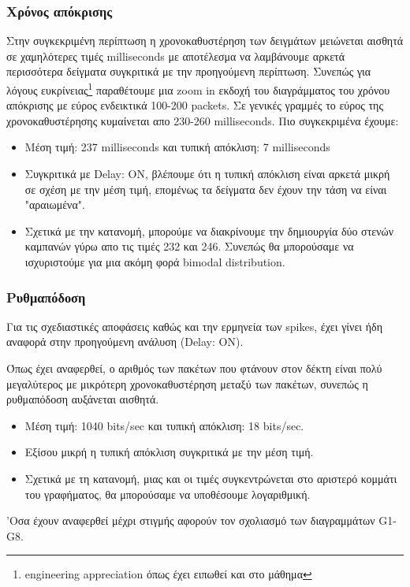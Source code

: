 \documentclass[hidelinks, 12pt, a4paper]{article}
\begin{document}
\subsubsection{Χρόνος απόκρισης}
Στην συγκεκριμένη περίπτωση η χρονοκαθυστέρηση των δειγμάτων μειώνεται αισθητά σε χαμηλότερες τιμές milliseconds με αποτέλεσμα να λαμβάνουμε αρκετά περισσότερα δείγματα συγκριτικά με την προηγούμενη περίπτωση. Συνεπώς για λόγους ευκρίνειας\footnote{engineering appreciation όπως έχει ειπωθεί και στο μάθημα} παραθέτουμε μια zoom in εκδοχή του διαγράμματος του χρόνου απόκρισης με εύρος ενδεικτικά 100-200 packets. Σε γενικές γραμμές το εύρος της χρονοκαθυστέρησης κυμαίνεται απο 230-260 milliseconds. Πιο συγκεκριμένα έχουμε:
\begin{itemize}
    \item Μέση τιμή: 237 milliseconds και τυπική απόκλιση: 7 milliseconds 
    \item Συγκριτικά με Delay: ON, βλέπουμε ότι η τυπική απόκλιση είναι αρκετά μικρή σε σχέση με την μέση τιμή, επομένως τα δείγματα δεν έχουν την τάση να είναι "αραιωμένα".
    \item Σχετικά με την κατανομή, μπορούμε να διακρίνουμε την δημιουργία δύο στενών καμπανών γύρω απο τις τιμές 232 και 246. Συνεπώς θα μπορούσαμε να ισχυριστούμε για μια ακόμη φορά bimodal distribution. 
\end{itemize}

\subsubsection{Ρυθμαπόδοση}
Για τις σχεδιαστικές αποφάσεις καθώς και την ερμηνεία των spikes, έχει γίνει ήδη αναφορά στην προηγούμενη ανάλυση (Delay: ON).

Όπως έχει αναφερθεί, ο αριθμός των πακέτων που φτάνουν στον δέκτη είναι πολύ μεγαλύτερος με μικρότερη χρονοκαθυστέρηση μεταξύ των πακέτων, συνεπώς η ρυθμαπόδοση αυξάνεται αισθητά.
\begin{itemize}
    \item Μέση τιμή: 1040 bits/sec και τυπική απόκλιση: 18 bits/sec.
    \item Εξίσου μικρή η τυπική απόκλιση συγκριτικά με την μέση τιμή.
    \item Σχετικά με τη κατανομή, μιας και οι τιμές συγκεντρώνεται στο αριστερό κομμάτι του γραφήματος, θα μπορούσαμε να υποθέσουμε λογαριθμική.
\end{itemize}


'Οσα έχουν αναφερθεί μέχρι στιγμής αφορούν τον σχολιασμό των διαγραμμάτων G1-G8.
\end{document}
